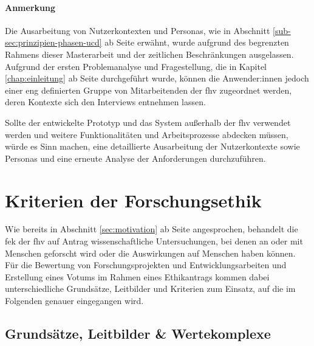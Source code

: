 \documentclass[a4paper,12pt,twoside,numbers=noendperiod]{scrreprt}
\begin{document}
\subsubsection*{Anmerkung}
\label{sub-sub-sec:ucd-verknüpfung-anmerkung}

Die Ausarbeitung von Nutzerkontexten und Personas, wie in Abschnitt \ref{sub-sec:prinzipien-phasen-ucd} ab Seite \pageref{sub-sec:prinzipien-phasen-ucd} erwähnt, wurde aufgrund des begrenzten Rahmens dieser Masterarbeit und der zeitlichen Beschränkungen ausgelassen. Aufgrund der ersten Problemanalyse und Fragestellung, die in Kapitel \ref{chap:einleitung} ab Seite \pageref{chap:einleitung} durchgeführt wurde, können die Anwender:innen jedoch einer eng definierten Gruppe von Mitarbeitenden der \ac{fhv} zugeordnet werden, deren Kontexte sich den Interviews entnehmen lassen.

Sollte der entwickelte Prototyp und das System außerhalb der \acl{fhv} verwendet werden und weitere Funktionalitäten und Arbeitsprozesse abdecken müssen, würde es Sinn machen, eine detaillierte Ausarbeitung der Nutzerkontexte sowie Personas und eine erneute Analyse der Anforderungen durchzuführen.

\cleardoublepage
\chapter{Kriterien der Forschungsethik}
\label{chap:kriterien-forschungsethik}

Wie bereits in Abschnitt \ref{sec:motivation} ab Seite \pageref{chap:einleitung} angesprochen, behandelt die \acl{fek} der \acl{fhv} auf Antrag wissenschaftliche Untersuchungen, bei denen an oder mit Menschen geforscht wird oder die Auswirkungen auf Menschen haben können. \cite{fachhochschule_vorarlberg_gmbh_forschungsethik-kommission_2021} Für die Bewertung von Forschungsprojekten und Entwicklungsarbeiten und Erstellung eines Votums im Rahmen eines Ethikantrags kommen dabei unterschiedliche Grundsätze, Leitbilder und Kriterien zum Einsatz, auf die im Folgenden genauer eingegangen wird.

\section{Grundsätze, Leitbilder \& Wertekomplexe}
\label{sec:grundsätze-leitbilder-wertekomplexe}
\end{document}
